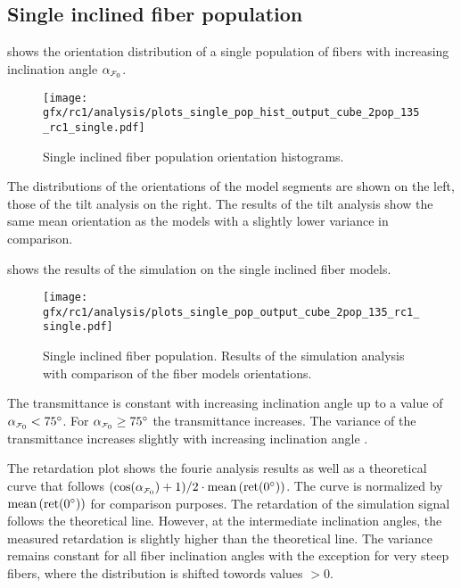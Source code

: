 \subsection{Single inclined fiber population}
\label{sec:resSingleIncl}
%
 shows the orientation distribution of a single population of fibers with increasing inclination angle $\modelInc{}$.
% 
\begin{figure}[!t]
    \centering
    \texttt{[image: gfx/rc1/analysis/plots\_single\_pop\_hist\_output\_cube\_2pop\_135\_rc1\_single.pdf]}
    \caption{Single inclined fiber population orientation histograms. }
    \label{fig:single_fiber_pop_hist}
\end{figure}
% 
The distributions of the orientations of the model segments are shown on the left, those of the tilt analysis on the right.
The results of the tilt analysis show the same mean orientation as the models with a slightly lower variance in comparison.
\par
% 
 shows the results of the simulation on the single inclined fiber models.
\par
% 
\begin{figure}[!p]
    \centering
    \texttt{[image: gfx/rc1/analysis/plots\_single\_pop\_output\_cube\_2pop\_135\_rc1\_single.pdf]}
    \caption{Single inclined fiber population. Results of the simulation analysis with comparison of the fiber models orientations.}
    \label{fig:single_fiber_pop_rofl}
\end{figure}
% 
The transmittance is constant with increasing inclination angle up to a value of $\modelInc<\SI{75}{\degree}$.
For $\modelInc \ge \SI{75}{\degree}$ the transmittance increases.
The variance of the transmittance increases slightly with increasing inclination angle \modelInc{}.
\par
%
The retardation plot shows the fourie analysis results as well as a theoretical curve that follows $(\cos(\modelInc) + 1) / 2 \cdot \mean\left(\mathrm{ret}(\SI{0}{\degree})\right)$.
The curve is normalized by $\operatorname{mean}\left(\mathrm{ret}(\SI{0}{\degree})\right)$ for comparison purposes.
The retardation of the simulation signal follows the theoretical line.
However, at the intermediate inclination angles, the measured retardation is slightly higher than the theoretical line.
The variance remains constant for all fiber inclination angles \modelInc{} with the exception for very steep fibers, where the distribution is shifted towords values $>0$.
